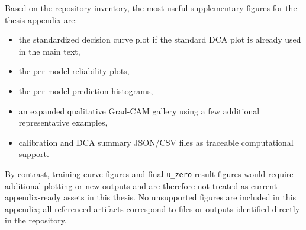 Based on the repository inventory, the most useful supplementary figures for the thesis appendix are:

\begin{itemize}
    \item the standardized decision curve plot if the standard DCA plot is already used in the main text,
    \item the per-model reliability plots,
    \item the per-model prediction histograms,
    \item an expanded qualitative Grad-CAM gallery using a few additional representative examples,
    \item calibration and DCA summary JSON/CSV files as traceable computational support.
\end{itemize}

By contrast, training-curve figures and final \texttt{u\_zero} result figures would require additional plotting or new outputs and are therefore not treated as current appendix-ready assets in this thesis. No unsupported figures are included in this appendix; all referenced artifacts correspond to files or outputs identified directly in the repository.
